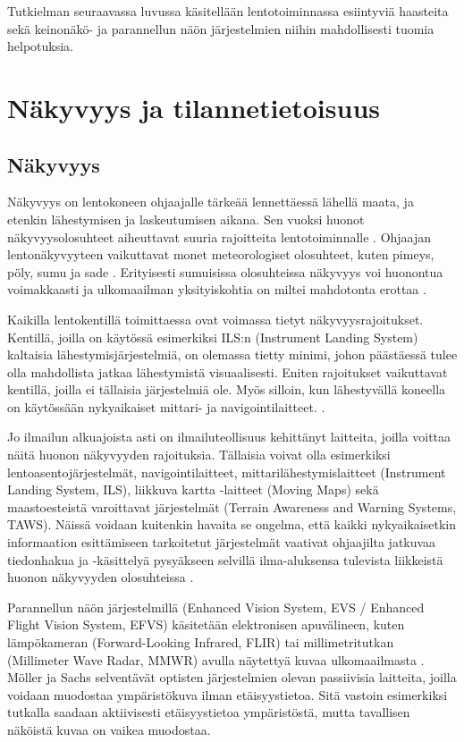 \documentclass[utf8,bachelor,manualbib]{gradu3}
\begin{document}
Tutkielman seuraavassa luvussa käsitellään lentotoiminnassa esiintyviä haasteita sekä keinonäkö- ja parannellun näön järjestelmien niihin mahdollisesti tuomia helpotuksia.

\chapter{Näkyvyys ja tilannetietoisuus}

\section{Näkyvyys}

Näkyvyys on lentokoneen ohjaajalle tärkeää lennettäessä lähellä maata, ja etenkin lähestymisen ja laskeutumisen aikana. Sen vuoksi huonot näkyvyysolosuhteet aiheuttavat suuria rajoitteita lentotoiminnalle \citep{mollersachs1994, prinzelym2013}. Ohjaajan lentonäkyvyyteen vaikuttavat monet meteorologiset olosuhteet, kuten pimeys, pöly, sumu ja sade \citep{wickensalexander2009}. Erityisesti sumuisissa olosuhteissa näkyvyys voi huonontua voimakkaasti ja ulkomaailman yksityiskohtia on miltei mahdotonta erottaa \citep{beiergemperlein2004}.

Kaikilla lentokentillä toimittaessa ovat voimassa tietyt näkyvyysrajoitukset. Kentillä, joilla on käytössä esimerkiksi ILS:n (Instrument Landing System) kaltaisia lähestymisjärjestelmiä, on olemassa tietty minimi, johon päästäessä tulee olla mahdollista jatkaa lähestymistä visuaalisesti. Eniten rajoitukset vaikuttavat kentillä, joilla ei tällaisia järjestelmiä ole. Myös silloin, kun lähestyvällä koneella on käytössään nykyaikaiset mittari- ja navigointilaitteet. \cite{mollersachs1994}.

Jo ilmailun alkuajoista asti on ilmailuteollisuus kehittänyt laitteita, joilla voittaa näitä huonon näkyvyyden rajoituksia. Tällaisia voivat olla esimerkiksi lentoasentojärjestelmät, navigointilaitteet, mittarilähestymislaitteet (Instrument Landing System, ILS), liikkuva kartta -laitteet (Moving Maps) sekä maastoesteistä varoittavat järjestelmät (Terrain Awareness and Warning Systems, TAWS). Näissä voidaan kuitenkin havaita se ongelma, että kaikki nykyaikaisetkin informaation esittämiseen tarkoitetut järjestelmät vaativat ohjaajilta jatkuvaa tiedonhakua ja -käsittelyä pysyäkseen selvillä ilma-aluksensa tulevista liikkeistä huonon näkyvyyden olosuhteissa \citep {prinzel2004}.

Parannellun näön järjestelmillä (Enhanced Vision System, EVS / Enhanced Flight Vision System, EFVS) käsitetään elektronisen apuvälineen, kuten lämpökameran (Forward-Looking Infrared, FLIR) tai millimetritutkan (Millimeter Wave Radar, MMWR) avulla näytettyä kuvaa ulkomaailmasta \citep{baileyym2007}. Möller ja Sachs \citeyearpar{mollersachs1994} selventävät optisten järjestelmien olevan passiivisia laitteita, joilla voidaan muodostaa ympäristökuva ilman etäisyystietoa. Sitä vastoin esimerkiksi tutkalla saadaan aktiivisesti etäisyystietoa ympäristöstä, mutta tavallisen näköistä kuvaa on vaikea muodostaa.
\end{document}
